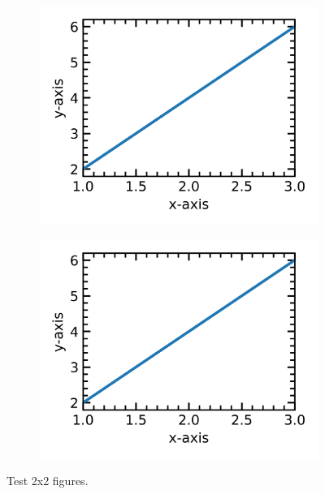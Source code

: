 \documentclass[12pt,a4paper,twoside]{article}
\numberwithin{equation}{section}
\renewcommand{\_}{\textscale{.7}{\textunderscore}}
\begin{document}
\begin{figure}[H]
	\centering
	\begin{subfigure}{0.45\linewidth}
		\includegraphics[width=1.0\linewidth]{2x2.png}
	\end{subfigure}
    \begin{subfigure}{0.45\linewidth}
		\includegraphics[width=1.0\linewidth]{2x2.png}
	\end{subfigure}
    \caption{Test 2x2 figures.}
\end{figure} 
\end{document}
